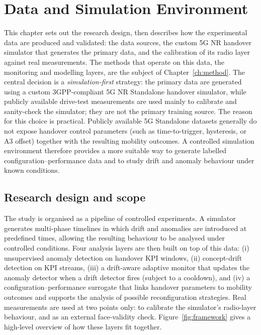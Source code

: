 
\chapter{Data and Simulation Environment}
\label{ch:data}

This chapter sets out the research design, then describes how the experimental
data are produced and validated: the data sources, the custom 5G NR handover
simulator that generates the primary data, and the calibration of its radio
layer against real measurements. The methods that operate on this data, the
monitoring and modelling layers, are the subject of
Chapter~\ref{ch:method}. The central
decision is a \emph{simulation-first} strategy: the primary data are generated
using a custom 3GPP-compliant 5G NR Standalone handover simulator, while publicly
available drive-test measurements are used mainly to calibrate and sanity-check
the simulator; they are not the primary training source. The reason for this
choice is practical. Publicly available 5G Standalone datasets generally do not
expose handover control parameters (such as time-to-trigger, hysteresis, or A3
offset) together with the resulting mobility outcomes. A controlled simulation
environment therefore provides a more suitable way to generate labelled
configuration--performance data and to study drift and anomaly behaviour under
known conditions.

\section{Research design and scope}
\label{sec:design}

The study is organised as a pipeline of controlled experiments. A simulator
generates multi-phase timelines in which drift and anomalies are introduced at
predefined times, allowing the resulting behaviour to be analysed under
controlled conditions. Four analysis layers are then built on top of this data:
(i) unsupervised anomaly detection on handover KPI windows, (ii) concept-drift
detection on KPI streams, (iii) a drift-aware adaptive monitor that updates the
anomaly detector when a drift detector fires (subject to a cooldown), and (iv) a
configuration--performance surrogate that links handover parameters to mobility
outcomes and supports the analysis of possible reconfiguration strategies. Real
measurements are used at two points only: to calibrate the simulator's
radio-layer behaviour, and as an external face-validity check.
Figure~\ref{fig:framework} gives a high-level overview of how these layers fit
together.

